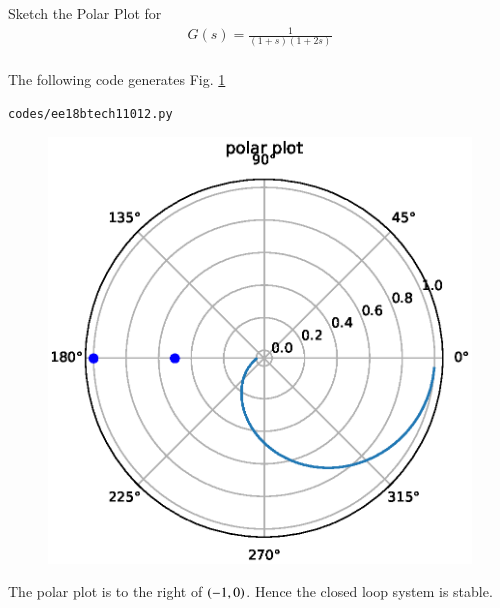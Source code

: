 \item
Sketch the Polar Plot for
\begin{align}
G(s) = \frac{1}{(1+s)(1+2s)}
\end{align}
\\
\solution  The following code generates Fig.     \ref{fig:ee18btech11012}

%
\begin{lstlisting}
codes/ee18btech11012.py
\end{lstlisting}
%
\begin{figure}
    \centering
    \includegraphics[width=\columnwidth]{./figs/ee18btech11012.eps}
    \caption{}
    \label{fig:ee18btech11012}
\end{figure}
%
The polar plot is to the right of $\left(-1,0\right)$.  Hence the closed loop system is stable.
%
